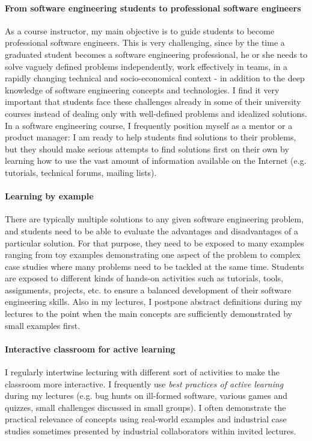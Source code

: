 \paragraph{From software engineering students to professional software engineers}
As a course instructor, my main objective is to guide students to become professional software engineers. This is very 
challenging, since by the time a graduated student becomes a software engineering professional, he or she needs to solve 
vaguely defined problems independently, work effectively in teams, in a rapidly changing technical and socio-economical 
context - in addition to the deep knowledge of software engineering concepts and technologies. I find it very important that 
students face these challenges already in some of their university courses instead of dealing only with well-defined 
problems and idealized solutions. In a software engineering course, I frequently position myself as a mentor or a product 
manager: I am ready to help students find solutions to their problems, but they should make serious attempts to find 
solutions first on their own by learning how to use the vast amount of information available on the Internet (e.g. tutorials, 
technical forums, mailing lists). 

\paragraph{Learning by example}
There are typically multiple solutions to any given software engineering problem, and students need to be able to evaluate 
the advantages and disadvantages of a particular solution. For that purpose, they need to be exposed to many examples 
ranging from toy examples demonstrating one aspect of the problem to complex case studies where many problems need to 
be tackled at the same time. Students are exposed to different kinds of hands-on activities such as tutorials, tools, 
assignments, projects, etc. to ensure a balanced development of their software engineering skills. Also in my lectures, I 
postpone abstract definitions during my lectures to the point when the main concepts are sufficiently demonstrated by small 
examples first.

\paragraph{Interactive classroom for active learning}
I regularly intertwine lecturing with different sort of activities to make the classroom more interactive. I frequently use 
\emph{best practices of active learning} during my lectures (e.g. bug hunts on ill-formed software, various games 
and quizzes, small challenges discussed in small groups). I often demonstrate the practical relevance of concepts 
using real-world examples and industrial case studies sometimes presented by industrial collaborators within invited 
lectures. 

